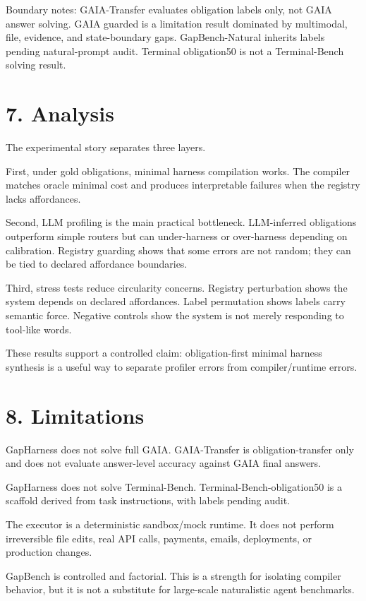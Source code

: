 \documentclass[
  10pt,
]{article}
\begin{document}
Boundary notes: GAIA-Transfer evaluates obligation labels only, not GAIA
answer solving. GAIA guarded is a limitation result dominated by
multimodal, file, evidence, and state-boundary gaps. GapBench-Natural
inherits labels pending natural-prompt audit. Terminal obligation50 is
not a Terminal-Bench solving result.

\section{7. Analysis}\label{analysis}

The experimental story separates three layers.

First, under gold obligations, minimal harness compilation works. The
compiler matches oracle minimal cost and produces interpretable failures
when the registry lacks affordances.

Second, LLM profiling is the main practical bottleneck. LLM-inferred
obligations outperform simple routers but can under-harness or
over-harness depending on calibration. Registry guarding shows that some
errors are not random; they can be tied to declared affordance
boundaries.

Third, stress tests reduce circularity concerns. Registry perturbation
shows the system depends on declared affordances. Label permutation
shows labels carry semantic force. Negative controls show the system is
not merely responding to tool-like words.

These results support a controlled claim: obligation-first minimal
harness synthesis is a useful way to separate profiler errors from
compiler/runtime errors.

\section{8. Limitations}\label{limitations}

GapHarness does not solve full GAIA. GAIA-Transfer is
obligation-transfer only and does not evaluate answer-level accuracy
against GAIA final answers.

GapHarness does not solve Terminal-Bench. Terminal-Bench-obligation50 is
a scaffold derived from task instructions, with labels pending audit.

The executor is a deterministic sandbox/mock runtime. It does not
perform irreversible file edits, real API calls, payments, emails,
deployments, or production changes.

GapBench is controlled and factorial. This is a strength for isolating
compiler behavior, but it is not a substitute for large-scale
naturalistic agent benchmarks.
\end{document}
